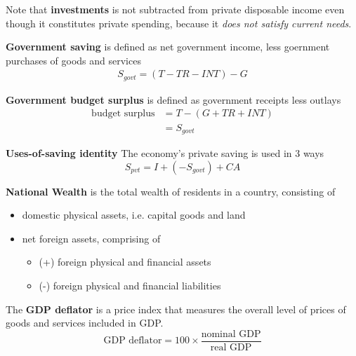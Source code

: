\documentclass[letterpaper, 9pt,landscape]{extarticle}
\begin{document}
\begin{multicols*}{5}
\begin{remark}
    Note that \textbf{investments} is not subtracted from private disposable income even though it constitutes private spending, because it \textit{does not satisfy current needs}.
\end{remark}

\begin{definition}
    \textbf{Government saving} is defined as net government income, less goernment purchases of goods and services 
    \begin{align*}
        S_{govt} = (T - TR - INT) - G
    \end{align*}
\end{definition}

\begin{remark}
    \textbf{Government budget surplus} is defined as government receipts less outlays 
    \begin{align*}
        \text{budget surplus} &= T - (G + TR + INT) \\
        &= S_{govt}
    \end{align*}
\end{remark}

\begin{theorem}
    \textbf{Uses-of-saving identity} The economy's private saving is used in 3 ways 
    \[
        S_{pvt} = I + (- S_{govt}) + CA
    \]
\end{theorem}

\begin{definition}
    \textbf{National Wealth} is the total wealth of residents in a country, consisting of 
    \begin{itemize}
        \item domestic physical assets, i.e. capital goods and land
        \item net foreign assets, comprising of 
        \begin{itemize}
            \item (+) foreign physical and financial assets 
            \item (-) foreign physical and financial liabilities 
        \end{itemize} 
    \end{itemize} 
\end{definition}


\begin{definition}
    The \textbf{GDP deflator} is a price index that measures the overall level of prices of goods and services included in GDP. 
    \[
        \text{GDP deflator} = 100 \times \frac{ \text{nominal GDP}}{ \text{real GDP}}
    \]
\end{definition}



\end{multicols*}
\end{document}
